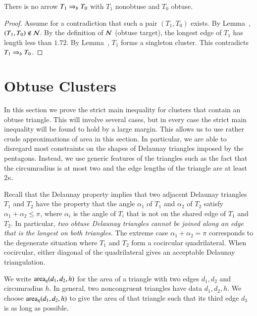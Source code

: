 \begin{lemma} 
  There is no arrow $T_1 \Rightarrow_{b} T_0$ with $T_1$ nonobtuse and $T_0$
  obtuse.
\end{lemma}

\begin{proof}  
  Assume for a contradiction that such a pair $(T_1,T_0)$ exists.  By
  Lemma~, $(T_1,T_0)\not\in\mathcal N$.  By the definition of
  $\mathcal N$ (obtuse target), the longest edge of $T_1$ has length less than
  $1.72$.  By Lemma~, $T_1$ forms a singleton
  cluster.  This contradicts $T_1\Rightarrow_{b} T_0$.
\end{proof}


\section{Obtuse Clusters}

In this section we prove the strict main inequality for clusters that
contain an obtuse triangle.  This will involve several cases, but in
every case the strict main inequality will be found to hold by a large
margin.  This allows us to use rather crude approximations of
area in this section.  In particular, we are able to disregard most
constraints on the shapes of Delaunay triangles imposed by the
pentagons.  Instead, we use generic features of the triangles such as
the fact that the circumradius is at most two and the edge lengths of
the triangle are at least $2\kappa$.


\begin{remark}
  Recall that the Delaunay property implies that two adjacent Delaunay
  triangles $T_1$ and $T_2$ have the property that the angle
  $\alpha_1$ of $T_1$ and $\alpha_2$ of $T_2$ satisfy $\alpha_1 +
  \alpha_2\le \pi$, where $\alpha_i$ is the angle of $T_i$ that is not
  on the shared edge of $T_1$ and $T_2$.  In particular, {\it two
    obtuse Delaunay triangles cannot be joined along an edge that is
    the longest on both triangles.}  The extreme case
  $\alpha_1+\alpha_2=\pi$ corresponds to the degenerate situation
  where $T_1$ and $T_2$ form a cocircular quadrilateral. When
  cocircular, either diagonal of the quadrilateral gives an acceptable
  Delaunay triangulation.
\end{remark}



We write ${\operatorname{area}}_\eta(d_1,d_2,h)$ for the area of a triangle with two edges
$d_1,d_2$ and circumradius $h$.  In general, two noncongruent
triangles have data $d_1,d_2,h$.  We choose ${\operatorname{area}}_\eta(d_1,d_2,h)$ to
give the area of that triangle such that its third edge $d_3$ is as
long as possible.

